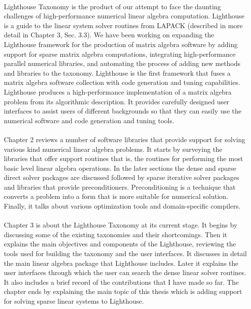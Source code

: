 \paragraph{}
Lighthouse Taxonomy is the product of our attempt to face the daunting challenges of high-performance numerical linear algebra computation. Lighthouse is a guide to the linear system solver routines from LAPACK \cite{lapack} (described in more detail in Chapter 3, Sec. 3.3). We have been working on expanding the Lighthouse framework for the production of matrix algebra software by adding support for sparse matrix algebra computations, integrating high-performance parallel numerical libraries, and automating the process of adding new methods and libraries to the taxonomy. Lighthouse is the first framework that fuses a matrix algebra software collection with code generation and tuning capabilities. Lighthouse produces a high-performance implementation of a matrix algebra problem from its algorithmic description. It provides carefully designed user interfaces to assist users of different backgrounds so that they can easily use the numerical software and code generation and tuning tools.

\paragraph{}
Chapter 2 reviews a number of software libraries that provide support for solving various kind numerical linear algebra problems. It starts by surveying the libraries that offer support routines that is, the routines for performing the most basic level linear algebra operations. In the later sections the dense and sparse direct solver packages are discussed followed by sparse iterative solver packages and libraries that provide preconditioners. Preconditioning is a technique that converts a problem into a form that is more suitable for numerical solution. Finally, it talks about various optimization tools and domain-specific compilers. 

\paragraph{}
Chapter 3 is about the Lighthouse Taxonomy at its current stage. It begins by discussing some of the existing taxonomies and their shortcomings. Then it explains the main objectives and components of the Lighthouse, reviewing the tools used for building the taxonomy and the user interfaces. It discusses in detail the main linear algebra package that Lighthouse includes. Later it explains the user interfaces through which the user can search the dense linear solver routines. It also includes a brief record of the contributions that I have made so far. The chapter ends by explaining the main topic of this thesis which is adding support for solving sparse linear systems to Lighthouse. 

